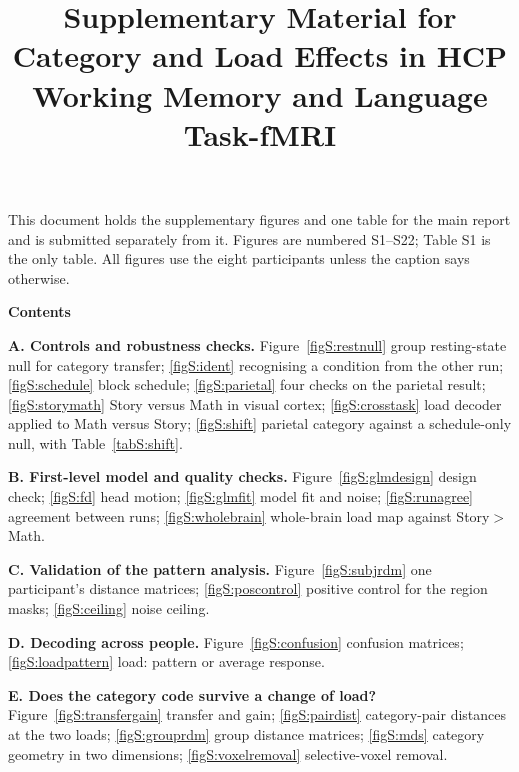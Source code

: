 \documentclass[conference]{IEEEtran}
\begin{document}
\title{Supplementary Material for\\ Category and Load Effects in HCP Working Memory and Language Task-fMRI}

\author{
\and
{}
}

\maketitle
\setcounter{figure}{0}
\renewcommand{\thefigure}{S\arabic{figure}}
\renewcommand{\thetable}{S\arabic{table}}

\noindent This document holds the supplementary figures and one table for the main report and is submitted separately from it. Figures are numbered S1--S22; Table S1 is the only table. All figures use the eight participants unless the caption says otherwise.

\medskip\noindent\textbf{Contents}\par\nopagebreak
{\small\setlength{\parindent}{0pt}\setlength{\parskip}{1pt}
\textbf{A. Controls and robustness checks.}
Figure~\ref{figS:restnull} group resting-state null for category transfer;
\ref{figS:ident} recognising a condition from the other run;
\ref{figS:schedule} block schedule;
\ref{figS:parietal} four checks on the parietal result;
\ref{figS:storymath} Story versus Math in visual cortex;
\ref{figS:crosstask} load decoder applied to Math versus Story;
\ref{figS:shift} parietal category against a schedule-only null, with Table~\ref{tabS:shift}.\par
\textbf{B. First-level model and quality checks.}
Figure~\ref{figS:glmdesign} design check;
\ref{figS:fd} head motion;
\ref{figS:glmfit} model fit and noise;
\ref{figS:runagree} agreement between runs;
\ref{figS:wholebrain} whole-brain load map against Story$>$Math.\par
\textbf{C. Validation of the pattern analysis.}
Figure~\ref{figS:subjrdm} one participant's distance matrices;
\ref{figS:poscontrol} positive control for the region masks;
\ref{figS:ceiling} noise ceiling.\par
\textbf{D. Decoding across people.}
Figure~\ref{figS:confusion} confusion matrices;
\ref{figS:loadpattern} load: pattern or average response.\par
\textbf{E. Does the category code survive a change of load?}
Figure~\ref{figS:transfergain} transfer and gain;
\ref{figS:pairdist} category-pair distances at the two loads;
\ref{figS:grouprdm} group distance matrices;
\ref{figS:mds} category geometry in two dimensions;
\ref{figS:voxelremoval} selective-voxel removal.\par}
\end{document}
